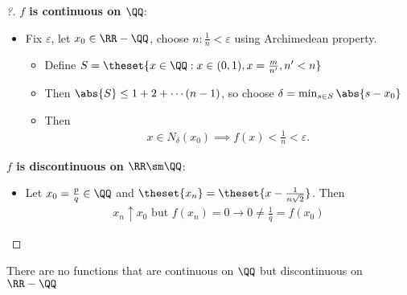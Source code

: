 \begin{proof}[?]

\envlist

\textbf{\(f\) is continuous on \(\QQ\)}:

\begin{itemize}
\tightlist
\item
  Fix \(\varepsilon\), let \(x_0 \in \RR-\QQ\), choose
  \(n: \frac{1}{n} < \varepsilon\) using Archimedean property.

  \begin{itemize}
  \tightlist
  \item
    Define \(S = \theset{x\in\QQ: x\in (0,1), x=\frac{m}{n'}, n' < n}\)
  \item
    Then \(\abs{S} \leq 1+2+\cdots (n-1)\), so choose
    \(\delta = \min_{s\in S}\abs{s-x_0}\)
  \item
    Then
    \begin{align*}
    x \in N_\delta(x_0) \implies f(x) < \frac{1}{n} < \varepsilon
    .\end{align*}
  \end{itemize}
\end{itemize}

\textbf{\(f\) is discontinuous on \(\RR\sm\QQ\)}:

\begin{itemize}
\tightlist
\item
  Let \(x_0 = \frac{p}{q} \in \QQ\) and
  \(\theset{x_n} = \theset{x-\frac{1}{n\sqrt 2}}\). Then
  \begin{align*}
  x_n \uparrow x_0\text{ but } f(x_n) = 0 \to 0 \neq \frac{1}{q} = f(x_0)
  \end{align*}
\end{itemize}

\end{proof}

\begin{remark}

There are no functions that are continuous on \(\QQ\) but discontinuous
on \(\RR-\QQ\)

\end{remark}

\begin{definition}


\end{definition}

\begin{definition}

\end{definition}

